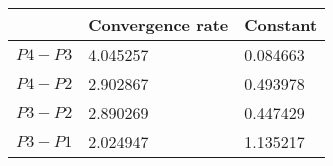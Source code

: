 \documentclass[11pt,a4paper]{report}
\begin{document}
\begin{center}
    \begin{tabular}{| l | l | l |}
    \hline
     & Convergence rate & Constant  \\ \hline
    $P4-P3$ & 4.045257 & 0.084663 \\ \hline
    $P4-P2$ & 2.902867 &  0.493978	\\ \hline
    $P3-P2$ & 2.890269 & 0.447429\\ \hline
    $P3-P1$ & 2.024947 &  1.135217	\\ \hline
    \end{tabular}
\end{center}
\end{document}

